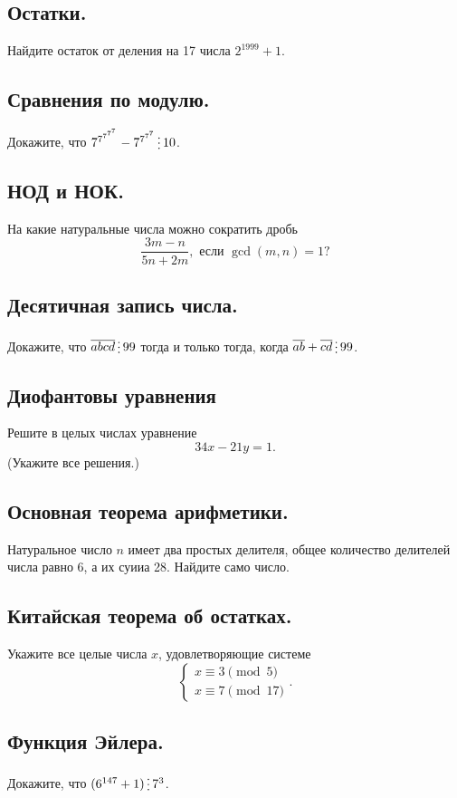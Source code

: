 \documentclass[12pt]{article}
\newcommand{\divisible}{\mathop{\raisebox{-2pt}{\vdots}}}
\begin{document}
    \subsection*{Остатки.}
        Найдите остаток от деления на 17 числа $2^{1999} + 1$.
    \subsection*{Сравнения по модулю.}
        Докажите, что $7^{7^{7^{7^{7}}}} - 7^{7^{7^{7}}} \divisible 10$.
    \subsection*{НОД и НОК.}
        На какие натуральные числа можно сократить дробь
        \[ \frac{3m - n}{5n + 2m}, \text{ если } \gcd(m, n)  = 1?\]
    \subsection*{Десятичная запись числа.}
        Докажите, что $\overline{abcd} \divisible 99$ тогда и только тогда, когда $\overline{ab} + \overline{cd} \divisible 99$.
    \subsection*{Диофантовы уравнения}
        Решите в целых числах уравнение
        \[ 34x - 21y = 1.\]
        (Укажите все решения.)
    \subsection*{Основная теорема арифметики.}
        Натуральное число $n$ имеет два простых делителя, общее количество делителей числа равно 6, а их суииа 28. Найдите само число.
    \subsection*{Китайская теорема об остатках.}
    Укажите все целые числа $x$, удовлетворяющие системе
    \[ \begin{cases} x \equiv 3 \pmod{5} \\ x \equiv 7 \pmod{17} \end{cases}.\]
    \subsection*{Функция Эйлера.}
    Докажите, что $(6^{147} + 1) \divisible 7^3$.
    \pagestyle{empty}
\end{document}
